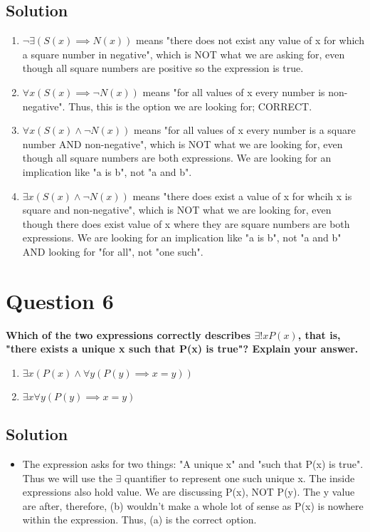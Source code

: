 \documentclass[11pt]{article}
\begin{document}
    \subsection*{Solution}
    \begin{enumerate}[label=(\alph*)]
        \item \(\neg \exists (S(x) \implies N(x))\) means "there does not exist any value of x for which a square number in negative", which is NOT what we are asking for, even though all square numbers are positive so the expression is true.
        \item \(\forall x(S(x) \implies \neg N(x))\) means "for all values of x every number is non-negative". Thus, this is the option we are looking for; CORRECT.
        \item \(\forall x(S(x) \land \neg N(x))\) means "for all values of x every number is a square number AND non-negative", which is NOT what we are looking for, even though all square numbers are both expressions. We are looking for an implication like "a is b", not "a and b".
        \item \(\exists x (S(x) \land \neg N(x))\) means "there does exist a value of x for whcih x is square and non-negative", which is NOT what we are looking for, even though there does exist value of x where they are square numbers are both expressions. We are looking for an implication like "a is b", not "a and b" AND looking for "for all", not "one such".
    \end{enumerate}
    
\clearpage
\section*{Question 6}
    \textbf{Which of the two expressions correctly describes \(\exists !xP(x)\), that is, "there exists a unique x such that P(x) is true"? Explain your answer.}
    \begin{enumerate}[label=(\alph*)]
        \item \(\exists x (P(x) \land \forall y (P(y) \implies x = y))\)
        \item \(\exists x \forall y (P(y) \implies x =y)\)
    \end{enumerate}
    \subsection*{Solution}
    \begin{itemize}
        \item[] The expression asks for two things: "A unique x" and "such that P(x) is true". Thus we will use the \(\exists\) quantifier to represent one such unique x. The inside expressions also hold value. We are discussing P(x), NOT P(y). The y value are after, therefore, (b) wouldn't make a whole lot of sense as P(x) is nowhere within the expression. Thus, (a) is the correct option.
    \end{itemize}
\end{document}
